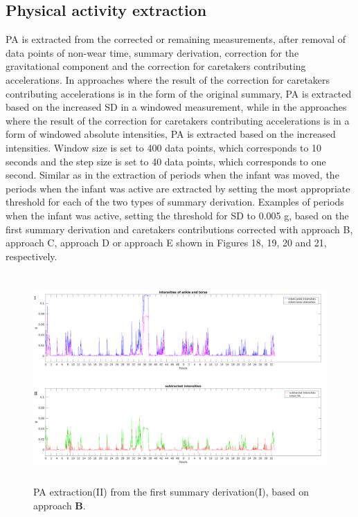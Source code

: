 \documentclass{article}
\begin{document}
{\subsection{Physical activity extraction}
PA is extracted from the corrected or remaining measurements, after removal of data points of non-wear time, summary derivation, correction for the gravitational component and the correction for caretakers contributing accelerations. In approaches where the result of the correction for caretakers contributing accelerations is in the form of the original summary, PA is extracted based on the increased SD in a windowed measurement, while in the approaches where the result of the correction for caretakers contributing accelerations is in a form of windowed absolute intensities, PA is extracted based on the increased intensities. Window size is set to 400 data points, which corresponds to 10 seconds and the step size is set to 40 data points, which corresponds to one second. Similar as in the extraction of periods when the infant was moved, the periods when the infant was active are extracted by setting the most appropriate threshold for each of the two types of summary derivation. Examples of periods when the infant was active, setting the threshold for SD to 0.005 g, based on the first summary derivation and caretakers contributions corrected with approach B, approach C, approach D or approach E shown in Figures 18, 19, 20 and 21, respectively.
\begin{figure}[h]
\includegraphics[width=15cm, height=8cm]{SubtractedIntensitiesPA.png}
\caption{PA extraction(II) from the first summary derivation(I), based on approach \textbf{B}.}
\end{figure}

}
\end{document}
